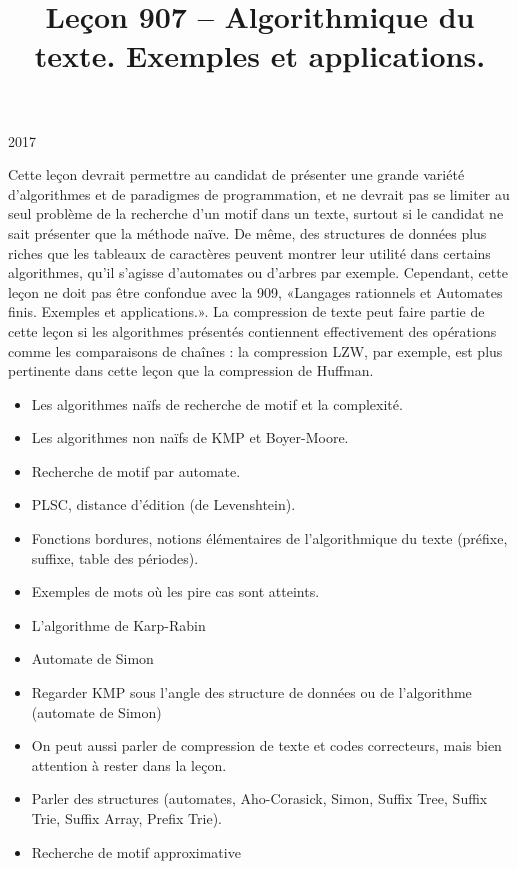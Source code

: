 \documentclass{agregfiche}
\title{Leçon 907 -- Algorithmique du texte. Exemples et applications.}
\begin{document}
\maketitle

\secrapports

\begin{rapport}{2017}

    Cette leçon devrait permettre au candidat de présenter une grande variété d’algorithmes et de paradigmes de programmation, et ne devrait pas se limiter au seul problème de la recherche d’un motif dans un texte, surtout si le candidat ne sait présenter que la méthode naïve. De même, des structures de données plus riches que les tableaux de caractères peuvent montrer leur utilité dans certains algorithmes, qu’il s’agisse d’automates ou d’arbres par exemple. Cependant, cette leçon ne doit pas être confondue avec la 909, «Langages rationnels et Automates finis. Exemples et applications.». La compression de texte peut faire partie de cette leçon si les algorithmes présentés contiennent effectivement des opérations comme les comparaisons de chaînes : la compression LZW, par exemple, est plus pertinente dans cette leçon que la compression de Huffman.

\end{rapport}

\secindispensables

\begin{itemize}
    \item Les algorithmes naïfs de recherche de motif et la complexité.
    \item Les algorithmes non naïfs de KMP et Boyer-Moore.
    \item Recherche de motif par automate.

\end{itemize}

\secasavoir
\begin{itemize}

	\item PLSC, distance d'édition (de Levenshtein).
	\item Fonctions bordures, notions élémentaires de l'algorithmique du texte (préfixe, suffixe, table des périodes).
	\item Exemples de mots où les pire cas sont atteints.
\end{itemize}

\secidees

\begin{itemize}
	\item L'algorithme de Karp-Rabin
	\item Automate de Simon
	\item Regarder KMP sous l'angle des structure de données 
	ou de l'algorithme (automate de Simon)
	\item 
	On peut aussi parler de compression de texte et codes 
	correcteurs, mais bien attention à rester dans la leçon.
	\item 
	Parler des structures (automates, Aho-Corasick, Simon,
	Suffix Tree, Suffix Trie, Suffix Array, Prefix Trie).
	
	\item Recherche de motif approximative
\end{itemize}
\end{document}
